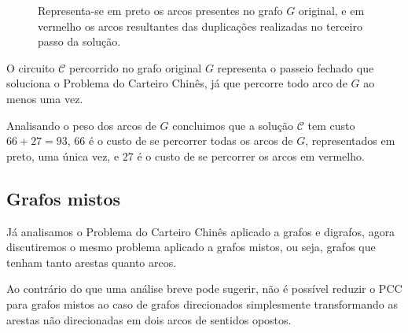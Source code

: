 \begin{itemize}
\begin{figure}[H]
        \caption{Representa-se em preto os arcos presentes no grafo $G$ original, e em vermelho os arcos resultantes das duplicações realizadas no terceiro passo da solução.}
    \end{figure}

    O circuito $\mathcal{C}$ percorrido no grafo original $G$ representa o passeio fechado que soluciona o Problema do Carteiro Chinês, já que percorre todo arco de $G$ ao menos uma vez.

    Analisando o peso dos arcos de $G$ concluimos que a solução $\mathcal{C}$ tem custo $66+27 = 93$, $66$ é o custo de se percorrer todas os arcos de $G$, representados em preto, uma única vez, e $27$ é o custo de se percorrer os arcos em vermelho.

    \end{itemize}

    \subsection{Grafos mistos}

    Já analisamos o Problema do Carteiro Chinês aplicado a grafos e digrafos, agora discutiremos o mesmo problema aplicado a grafos mistos, ou seja, grafos que tenham tanto arestas quanto arcos.

    Ao contrário do que uma análise breve pode sugerir, não é possível reduzir o PCC para grafos mistos ao caso de grafos direcionados simplesmente transformando as arestas não direcionadas em dois arcos de sentidos opostos.

